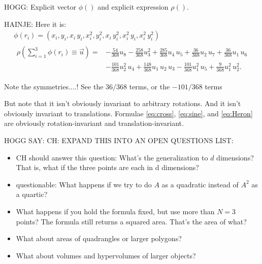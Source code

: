 \documentclass[12pt]{article}
\begin{document}
HOGG: Explicit vector $\phi()$ and explicit expression $\rho()$.

HAINJE: Here it is:
\begin{gather}
    \phi(r_i) = (x_i, y_i, x_i\,y_i, x_i^2, y_i^2, x_i\,y_i^2, x_i^2\,y_i, x_i^2\,y_i^2) \\
    \begin{aligned}
    \rho(\textstyle\sum_{i=1}^{3}\phi(r_i)\equiv \vec{u}) = &
    - \tfrac{54}{368} u_8
    - \tfrac{258}{368} u_3^2
    + \tfrac{285}{368} u_4\,u_5
    + \tfrac{36}{368} u_2\,u_7
    + \tfrac{36}{368} u_1\,u_6 \\ &
    - \tfrac{101}{368} u_2^2\,u_4
    + \tfrac{148}{368} u_1\,u_2\,u_3
    - \tfrac{101}{368} u_1^2\,u_5
    + \tfrac{9}{368} u_1^2\,u_2^2.
    \end{aligned}
\end{gather}

Note the symmetries....! See the $36/368$ terms, or the $-101/368$ terms

But note that it isn't obviously invariant to arbitrary rotations.
And it isn't obviously invariant to translations.
Formulae \eqref{eq:cross}, \eqref{eq:sine}, and \eqref{eq:Heron} are obviously rotation-invariant and translation-invariant.

HOGG SAY: CH: EXPAND THIS INTO AN OPEN QUESTIONS LIST:
\begin{itemize}
\item CH should answer this question: What's the generalization to $d$ dimensions? That is, what if the three points are each in d dimensions?
\item questionable: What happens if we try to do $A$ as a quadratic instead of $A^2$ as a quartic?
\item What happens if you hold the formula fixed, but use more than $N=3$ points?
The formula still returns a squared area.
That's the area of what?
\item What about areas of quadrangles or larger polygons?
\item What about volumes and hypervolumes of larger objects?
\end{itemize}
\end{document}
